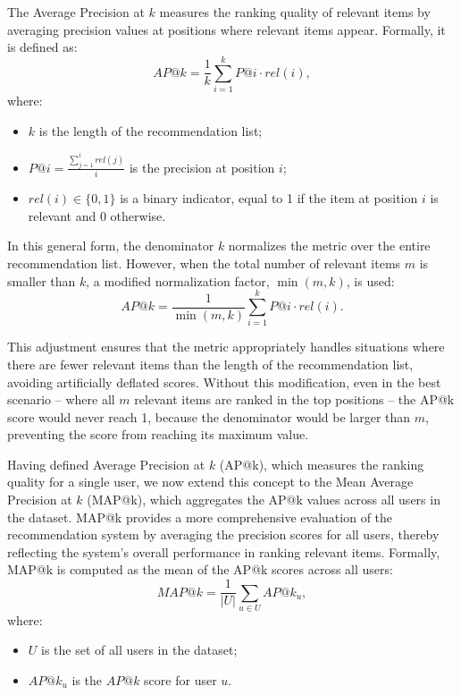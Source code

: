 \documentclass{tpms-l}
\theoremstyle{definition}
\theoremstyle{remark}
\numberwithin{equation}{section}
\begin{document}
The  Average  Precision at  $k$  measures the ranking quality of relevant items by averaging precision values at positions where relevant items appear. Formally, it is defined as:
\begin{equation}\label{eq1}
AP@k=\frac 1k \sum_{i=1}^{k}P@i \cdot rel(i),
\end{equation}
where:
\begin{itemize}
    \item $k$ is the length of the recommendation list;
    \item $P@i=\frac {\sum_{j=1}^{i}rel(j)}{i}$ is the precision at position $i$;
    \item $rel(i)\in\{0,1\}$ is a binary indicator, equal to 1 if the item at position $i$ is relevant and 0 otherwise.
\end{itemize}

In this general form, the denominator $k$ normalizes the metric over the entire recommendation list. However, when the total number of relevant items $m$ is smaller than $k$, a modified normalization factor, $\min(m,k)$, is used:
\begin{equation} \label{eq2}
AP@k=\frac {1}{\min(m,k)} \sum_{i=1}^{k}P@i \cdot rel(i).
\end{equation}

This adjustment ensures that the metric appropriately handles situations where there are fewer relevant items than the length of the recommendation list, avoiding artificially deflated scores. Without this modification, even in the best scenario – where all $m$ relevant items are ranked in the top positions – the AP@k score would never reach 1, because the denominator would be larger than $m$, preventing the score from reaching its maximum value.

Having defined Average Precision at $k$ (AP@k), which measures the ranking quality for a single user, we now extend this concept to the Mean Average Precision at $k$ (MAP@k), which aggregates the AP@k values across all users in the dataset. MAP@k provides a more comprehensive evaluation of the recommendation system by averaging the precision scores for all users, thereby reflecting the system's overall performance in ranking relevant items.
Formally, MAP@k is computed as the mean of the AP@k scores across all users:
\begin{equation} \label{eq3}
MAP@k=\frac 1{\lvert U \rvert} \sum_{u \in U}AP@k_u,
\end{equation}
where:
\begin{itemize}
    \item $U$ is the set of all users in the dataset;
    \item $AP@k_u$ is the $AP@k$ score for user $u$.
\end{itemize}
\end{document}

